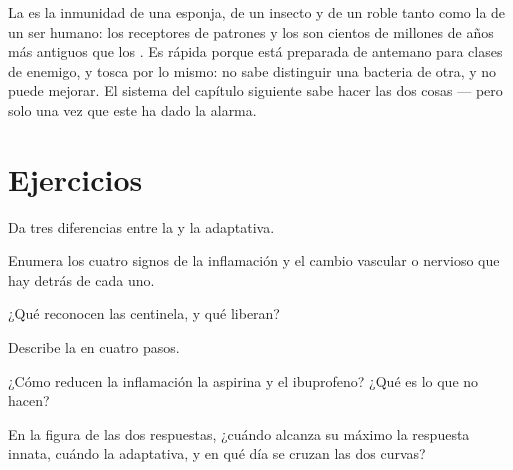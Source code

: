 \begin{remark}\label{rem:g12:innate-immunity:old}
La  es la inmunidad de una esponja, de un insecto y de
un roble tanto como la de un ser humano: los receptores de patrones y
los  son cientos de millones de años más antiguos que los
. Es rápida porque está preparada de antemano para clases de
enemigo, y tosca por lo mismo: no sabe distinguir una bacteria de otra,
y no puede mejorar. El sistema del capítulo siguiente sabe hacer las
dos cosas --- pero solo una vez que este ha dado la alarma.
\end{remark}

\section{Ejercicios}

\begin{exercise}[$\star$]\label{exo:g12:innate-immunity:1}
Da tres diferencias entre la  y la adaptativa.
\end{exercise}

\begin{exercise}[$\star$]\label{exo:g12:innate-immunity:2}
Enumera los cuatro signos de la inflamación y el cambio vascular o
nervioso que hay detrás de cada uno.
\end{exercise}

\begin{exercise}[$\star$]\label{exo:g12:innate-immunity:3}
¿Qué reconocen las  centinela, y qué liberan?
\end{exercise}

\begin{exercise}[$\star$]\label{exo:g12:innate-immunity:4}
Describe la  en cuatro pasos.
\end{exercise}

\begin{exercise}[$\star$]\label{exo:g12:innate-immunity:5}
¿Cómo reducen la inflamación la aspirina y el ibuprofeno? ¿Qué es lo
que no hacen?
\end{exercise}

\begin{exercise}[$\star\star$]\label{exo:g12:innate-immunity:6}
En la figura de las dos respuestas, ¿cuándo alcanza su máximo la
respuesta innata, cuándo la adaptativa, y en qué día se cruzan las dos
curvas?
\end{exercise}

